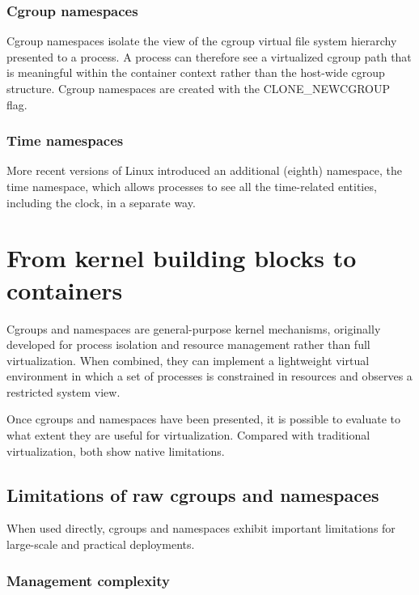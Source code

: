 \subsubsection*{Cgroup namespaces}

Cgroup namespaces isolate the view of the cgroup virtual file system hierarchy presented to a process. A process can therefore see a virtualized cgroup path that is meaningful within the container context rather than the host-wide cgroup structure. Cgroup namespaces are created with the CLONE\_NEWCGROUP flag.

\subsubsection*{Time namespaces}

More recent versions of Linux introduced an additional (eighth) namespace, the time namespace, which allows processes to see all the time-related entities, including the clock, in a separate way.

\section{From kernel building blocks to containers}

Cgroups and namespaces are general-purpose kernel mechanisms, originally developed for process isolation and resource management rather than full virtualization. When combined, they can implement a lightweight virtual environment in which a set of processes is constrained in resources and observes a restricted system view.

Once cgroups and namespaces have been presented, it is possible to evaluate to what extent they are useful for virtualization. Compared with traditional virtualization, both show native limitations.

\subsection{Limitations of raw cgroups and namespaces}

When used directly, cgroups and namespaces exhibit important limitations for large-scale and practical deployments.

\subsubsection*{Management complexity}


